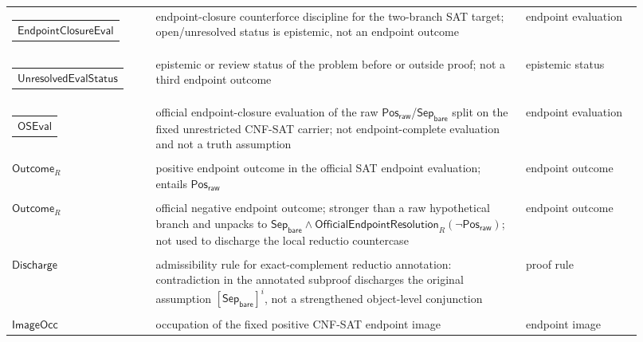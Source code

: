 \documentclass[11pt]{article}
\theoremstyle{definition}
\theoremstyle{remark}
\newcommand{\PosRaw}{\mathsf{Pos}_{\mathsf{raw}}}
\newcommand{\SepBare}{\mathsf{Sep}_{\mathsf{bare}}}
\newcommand{\OfficialEndpointResolution}{\mathsf{OfficialEndpointResolution}}
\newcommand{\OfficialSATEval}{\mathsf{OSEval}}
\newcommand{\UnresolvedEvalStatus}{\mathsf{UnresolvedEvalStatus}}
\newcommand{\EndpointClosureEval}{\mathsf{EndpointClosureEval}}
\begin{document}
\begin{longtable}{>{\raggedright\arraybackslash}p{0.21\linewidth}>{\raggedright\arraybackslash}p{0.54\linewidth}>{\raggedright\arraybackslash}p{0.17\linewidth}}
\begin{tabular}[t]{@{}l@{}}\(\EndpointClosureEval\)\end{tabular} & endpoint-closure counterforce discipline for the two-branch SAT target; open/unresolved status is epistemic, not an endpoint outcome & endpoint evaluation \\
\begin{tabular}[t]{@{}l@{}}\(\UnresolvedEvalStatus\)\end{tabular} & epistemic or review status of the problem before or outside proof; not a third endpoint outcome & epistemic status \\
\begin{tabular}[t]{@{}l@{}}\(\OfficialSATEval\)\end{tabular} & official endpoint-closure evaluation of the raw \(\PosRaw\)/\(\SepBare\) split on the fixed unrestricted CNF-SAT carrier; not endpoint-complete evaluation and not a truth assumption & endpoint evaluation \\
\begin{tabular}[t]{@{}l@{}}\(\mathsf{PosEndpoint}\)\\\(\mathsf{Outcome}_R\)\end{tabular} & positive endpoint outcome in the official SAT endpoint evaluation; entails \(\PosRaw\) & endpoint outcome \\
\begin{tabular}[t]{@{}l@{}}\(\mathsf{NegEndpoint}\)\\\(\mathsf{Outcome}_R\)\end{tabular} & official negative endpoint outcome; stronger than a raw hypothetical branch and unpacks to \(\SepBare\wedge\OfficialEndpointResolution_R(\neg\PosRaw)\); not used to discharge the local reductio countercase & endpoint outcome \\
\begin{tabular}[t]{@{}l@{}}\(\mathsf{Annotation}\)\\\(\mathsf{Discharge}\)\end{tabular} & admissibility rule for exact-complement reductio annotation: contradiction in the annotated subproof discharges the original assumption \([\SepBare]^i\), not a strengthened object-level conjunction & proof rule \\
\begin{tabular}[t]{@{}l@{}}\(\mathsf{SATEndpoint}\)\\\(\mathsf{ImageOcc}\)\end{tabular} & occupation of the fixed positive CNF-SAT endpoint image & endpoint image \\

\end{longtable}
\end{document}
